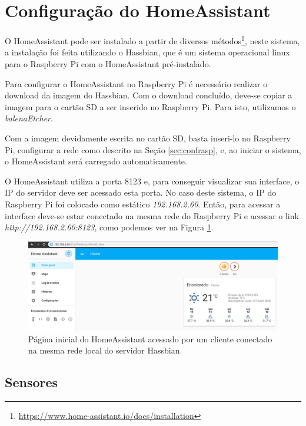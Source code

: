 \newpage

\section{Configuração do HomeAssistant}

O HomeAssistant pode ser instalado a partir de diversos métodos\footnote{\url{https://www.home-assistant.io/docs/installation}}, neste sistema, a instalação foi feita utilizando o Hassbian, que é um sistema operacional linux para o Raspberry Pi com o HomeAssistant pré-instalado.

Para configurar o HomeAssistant no Raspberry Pi é necessário realizar o download da imagem do Hassbian. Com o download concluído, deve-se copiar a imagem para o cartão SD a ser inserido no Raspberry Pi. Para isto, utilizamos o \textit{balenaEtcher}.

Com a imagem devidamente escrita no cartão SD, basta inseri-lo no Raspberry Pi, configurar a rede como descrito na Seção \ref{sec:confrasp}, e, ao iniciar o sistema, o HomeAssistant será carregado automaticamente.

O HomeAssistant utiliza a porta 8123 e, para conseguir visualizar sua interface, o IP do servidor deve ser acessado esta porta. No caso deste sistema, o IP do Raspberry Pi foi colocado como estático \textit{192.168.2.60}. Então, para acessar a interface deve-se estar conectado na mesma rede do Raspberry Pi e acessar o link \textit{http://192.168.2.60:8123}, como podemos ver na Figura \ref{fig:homeassistanthome}.

\begin{figure}[htbp]
	\centering
	\includegraphics[width=1\linewidth]{figuras/homeassistanthome.png}
	\caption{Página inicial do HomeAssistant acessado por um cliente conectado na mesma rede local do servidor Hassbian.}
	\label{fig:homeassistanthome}
\end{figure}

\subsection{Sensores}


